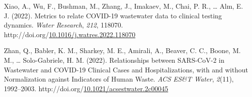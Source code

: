 \documentclass[12pt,twoside]{smiththesis}
\newlength{\cslhangindent}
\newenvironment{CSLReferences}[2] %
 {%
\setlength{\parindent}{0pt}
\ifodd #1 \everypar{\setlength{\hangindent}{\cslhangindent}}\ignorespaces\fi
\ifnum #2 > 0
\setlength{\parskip}{#2\baselineskip}
  \fi
}%
{}
\begin{document}
\begin{CSLReferences}{1}{0}
\leavevmode{}%
Xiao, A., Wu, F., Bushman, M., Zhang, J., Imakaev, M., Chai, P. R., \ldots{} Alm, E. J. (2022). Metrics to relate {COVID-19} wastewater data to clinical testing dynamics. \emph{Water Research}, \emph{212}, 118070. http://doi.org/\href{https://doi.org/10.1016/j.watres.2022.118070}{10.1016/j.watres.2022.118070}

\leavevmode{}%
Zhan, Q., Babler, K. M., Sharkey, M. E., Amirali, A., Beaver, C. C., Boone, M. M., \ldots{} Solo-Gabriele, H. M. (2022). Relationships between {SARS-CoV-2} in {Wastewater} and {COVID-19 Clinical Cases} and {Hospitalizations}, with and without {Normalization} against {Indicators} of {Human Waste}. \emph{ACS ES\&T Water}, \emph{2}(11), 1992--2003. http://doi.org/\href{https://doi.org/10.1021/acsestwater.2c00045}{10.1021/acsestwater.2c00045}

\end{CSLReferences}

\end{document}
